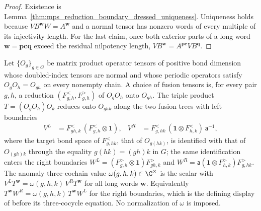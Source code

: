 \begin{proof}\leanok
    Existence is Lemma~\ref{thm:mps_reduction_boundary_dressed_uniqueness}.
    Uniqueness holds because $VB^{\mathbf w}W=A^{\mathbf w}$ and a normal
    tensor has nonzero words of every multiple of its injectivity length.
    For the last claim, once both exterior parts of a long word
    $\mathbf w=\mathbf p\mathbf c\mathbf q$ exceed the residual nilpotency
    length, $VB^{\mathbf w}=A^{\mathbf p\mathbf c}VB^{\mathbf q}$.
\end{proof}

\begin{definition}
    \label{def:mpug_anomaly_three_cochain}
    \leanok
    Let $\{O_g\}_{g\in G}$ be matrix product operator tensors of positive
    bond dimension whose doubled-index tensors are normal and whose periodic
    operators satisfy $O_g O_h=O_{gh}$ on every nonempty chain. A choice of
    fusion tensors is, for every pair $g,h$, a reduction
    $(F^<_{g,h},F^>_{g,h})$ of $O_gO_h$ onto $O_{gh}$. The triple product
    $T=(O_gO_h)O_k$ reduces onto $O_{ghk}$ along the two fusion trees with
    left boundaries
    \begin{align}
        V^{L} & =F^<_{gh,k}\,(F^<_{g,h}\otimes\mathbf 1),                  &
        V^{R} & =F^<_{g,hk}\,(\mathbf 1\otimes F^<_{h,k})\,\mathsf a^{-1},
    \end{align}
    where the target bond space of $F^<_{g,hk}$, that of $O_{g(hk)}$, is
    identified with that of $O_{(gh)k}$ through the equality
    $g(hk)=(gh)k$ in $G$; the same identification enters the right
    boundaries $W^L=(F^>_{g,h}\otimes\mathbf 1)F^>_{gh,k}$ and
    $W^R=\mathsf a(\mathbf 1\otimes F^>_{h,k})F^>_{g,hk}$.
    The anomaly three-cochain value $\omega(g,h,k)\in\C^\times$ is the scalar with
    $V^LT^{\mathbf w}=\omega(g,h,k)\,V^RT^{\mathbf w}$ for all long words
    $\mathbf w$. Equivalently $T^{\mathbf w}W^R=\omega(g,h,k)\,T^{\mathbf w}W^L$
    for the right boundaries, which is the defining display of
    \cite{FrancoRubio2025MPUGauging} before its three-cocycle equation.
    No normalization of $\omega$ is imposed.
\end{definition}

